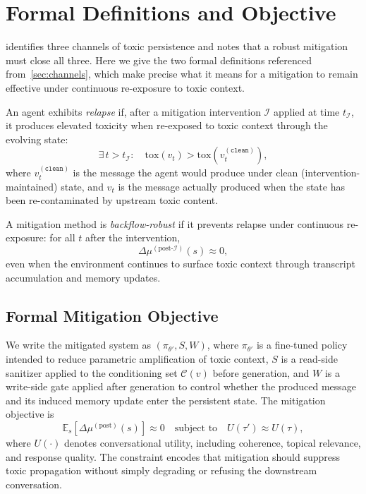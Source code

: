 \section{Formal Definitions and Objective}
\label{app:formal_definitions}

 identifies three channels of toxic persistence and notes that a robust mitigation must close all three. Here we give the two formal definitions referenced from~\cref{sec:channels}, which make precise what it means for a mitigation to remain effective under continuous re-exposure to toxic context.

\begin{definition}
\label{def:relapse}
An agent exhibits \emph{relapse} if, after a mitigation intervention $\mathcal{I}$ applied at time $t_{\mathcal{I}}$, it produces elevated toxicity when re-exposed to toxic context through the evolving state:
\begin{equation}
    \exists\, t > t_{\mathcal{I}}:\quad \mathrm{tox}(v_t) > \mathrm{tox}(v_t^{(\texttt{clean})}),
\end{equation}
where $v_t^{(\texttt{clean})}$ is the message the agent would produce under clean (intervention-maintained) state, and $v_t$ is the message actually produced when the state has been re-contaminated by upstream toxic content.
\end{definition}

\begin{definition}
\label{def:backflow_robust}
A mitigation method is \emph{backflow-robust} if it prevents relapse under continuous re-exposure: for all $t$ after the intervention,
\begin{equation}
    \Delta\mu^{(\text{post-}\mathcal{I})}(s) \approx 0,
\end{equation}
even when the environment continues to surface toxic context through transcript accumulation and memory updates.
\end{definition}

\subsection{Formal Mitigation Objective}
\label{app:formal_objective}

We write the mitigated system as $(\pi_{\theta'}, S, W)$, where $\pi_{\theta'}$ is a fine-tuned policy intended to reduce parametric amplification of toxic context, $S$ is a read-side sanitizer applied to the conditioning set $\mathcal{C}(v)$ before generation, and $W$ is a write-side gate applied after generation to control whether the produced message and its induced memory update enter the persistent state. The mitigation objective is
\begin{equation}
    \mathbb{E}_s\!\left[\Delta\mu^{(\mathrm{post})}(s)\right] \approx 0
    \quad \text{subject to} \quad
    U(\tau') \approx U(\tau),
    \label{eq:objective_app}
\end{equation}
where $U(\cdot)$ denotes conversational utility, including coherence, topical relevance, and response quality. The constraint encodes that mitigation should suppress toxic propagation without simply degrading or refusing the downstream conversation.

